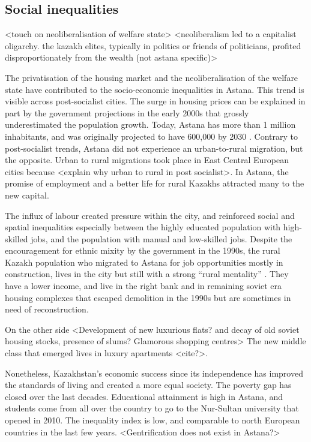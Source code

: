 \documentclass{article}
\begin{document}
\subsection{Social inequalities}

<touch on neoliberalisation of welfare state> 
<neoliberalism led to a capitalist oligarchy. the kazakh elites, typically in politics or friends of politicians, profited disproportionately from the wealth (not astana specific)>

The privatisation of the housing market and the neoliberalisation of the welfare state have contributed to the socio-economic inequalities in Astana. This trend is visible across post-socialist cities. The surge in housing prices can be explained in part by the government projections in the early 2000s that grossly underestimated the population growth. Today, Astana has more than 1 million inhabitants, and was originally projected to have 600,000 by 2030 \parencite{cover}. Contrary to post-socialist trends, Astana did not experience an urban-to-rural migration, but the opposite. Urban to rural migrations took place in East Central European cities because <explain why urban to rural in post socialist>. In Astana, the promise of employment and a better life for rural Kazakhs attracted many to the new capital.

The influx of labour created pressure within the city, and reinforced social and spatial inequalities especially between the highly educated population with high-skilled jobs, and the population with manual and low-skilled jobs.
Despite the encouragement for ethnic mixity by the government in the 1990s, the rural Kazakh population who migrated to Astana for job opportunities mostly in construction, lives in the city but still with a strong ``rural mentality'' \parencite{koch2014bordering}. They have a lower income, and live in the right bank and in remaining soviet era housing complexes that escaped demolition in the 1990s but are sometimes in need of reconstruction.

On the other side <Development of new luxurious flats? and decay of old soviet housing stocks, presence of slums? Glamorous shopping centres>
The new middle class that emerged lives in luxury apartments <cite?>.

Nonetheless, Kazakhstan's economic success since its independence has improved the standards of living and created a more equal society. The poverty gap has closed over the last decades. Educational attainment is high in Astana, and students come from all over the country to go to the Nur-Sultan university that opened in 2010. The inequality index is low, and comparable to north European countries in the last few years. <Gentrification does not exist in Astana?>
\end{document}
